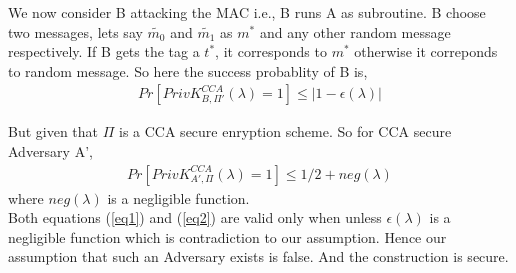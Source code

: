 












We now consider B attacking the MAC i.e., B runs A as subroutine. B choose two messages, lets 
say $\widetilde{m_0}$ and $\widetilde{m_1}$ as $m^*$ and any other random message
respectively. If B gets the tag a $t^*$, it corresponds to $m^*$ otherwise it correponds 
to random message. So here the success probablity of B is,
\begin{align}
    Pr[ PrivK_{B,\Pi'}^{CCA}(\lambda) = 1] \leq |1 - \epsilon(\lambda)|
    \label{eq1}
\end{align}

But given that $\Pi$ is a CCA secure enryption scheme. So for CCA secure Adversary A',
\begin{align}
    Pr[ PrivK_{A',\Pi}^{CCA}(\lambda) = 1]  \leq 1/2 + neg(\lambda)
    \label{eq2}
\end{align}
where $neg(\lambda)$ is a negligible function. \\

Both equations (\ref*{eq1}) and (\ref*{eq2}) are valid only when
unless $\epsilon(\lambda)$ is a negligible function which is contradiction to 
our assumption. Hence our assumption that such an Adversary exists is false. 
And the construction is secure.

